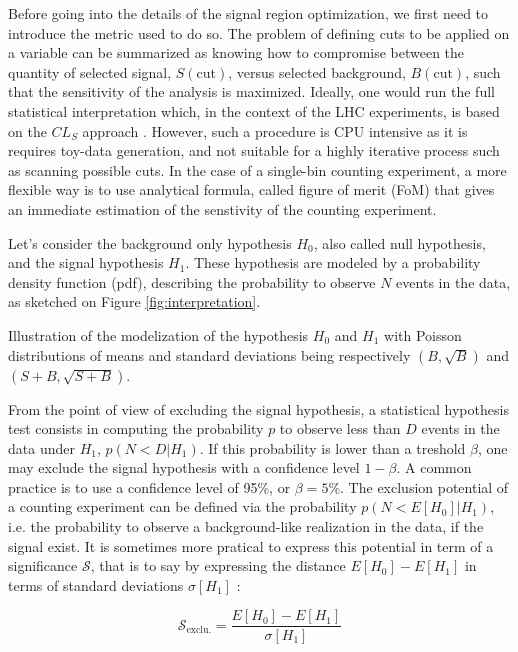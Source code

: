     Before going into the details of the signal region optimization, we first need to
    introduce the metric used to do so. The problem of defining cuts to be applied on a
    variable can be summarized as knowing how to compromise between the quantity of
    selected signal, $S(\text{cut})$, versus selected background, $B(\text{cut})$, such
    that the sensitivity of the analysis is maximized. Ideally, one would run the full
    statistical interpretation which, in the context of the LHC experiments, is based
    on the $CL_S$ approach . However, such a procedure is CPU intensive as it is
    requires toy-data generation, and not suitable for a highly iterative process such
    as scanning possible cuts. In the case of a single-bin counting experiment, a more
    flexible way is to use analytical formula, called figure of merit (FoM) that gives an
    immediate estimation of the senstivity of the counting experiment.

    Let's consider the background only hypothesis $H_0$, also called null hypothesis,
    and the signal hypothesis $H_1$. These hypothesis are modeled by a probability density
    function (pdf), describing the probability to observe $N$ events in the data, as
    sketched on Figure \ref{fig:interpretation}.

                 {Illustration of the modelization of the hypothesis $H_0$ and $H_1$ with
                 Poisson distributions of means and standard deviations being respectively
                 $(B,\sqrt{B})$ and $(S+B,\sqrt{S+B})$. }

    From the point of view of excluding the signal hypothesis, a statistical hypothesis
    test consists in computing the probability $p$ to observe less than $D$ events in the
    data under $H_1$, $p(N < D|H_1)$. If this probability is lower than a treshold
    $\beta$, one may exclude the signal hypothesis with a confidence level $1-\beta$. A
    common practice is to use a confidence level of 95\%, or $\beta = 5\%$. The exclusion
    potential of a counting experiment can be defined via the probability $p(N < E[H_0]|H_1)$,
    i.e. the probability to observe a background-like realization in the data, if the
    signal exist. It is sometimes more pratical to express this potential in term of a
    significance $\mathcal{S}$, that is to say by expressing the distance $E[H_0] -
    E[H_1]$ in terms of standard deviations $\sigma[H_1]$ :

    $$ \mathcal{S}_\text{exclu.} = \frac{E[H_0] - E[H_1]}{\sigma[H_1]}$$

